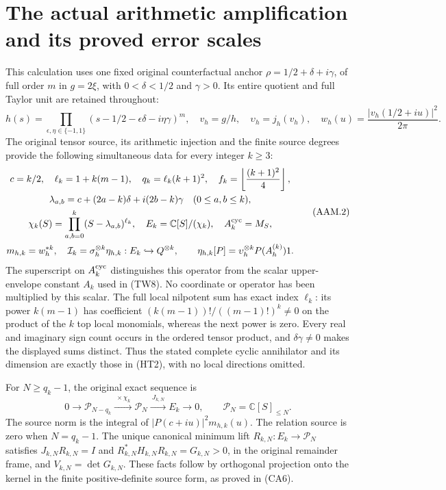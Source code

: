 \section{The actual arithmetic amplification and its proved error scales}
\label{CFStage:sec:arithmetic-amplification-match}

This calculation uses one fixed original counterfactual anchor
$\rho=1/2+\delta+i\gamma$, of full order $m$ in $g=2\xi$, with
$0<\delta<1/2$ and $\gamma>0$. Its entire quotient and full Taylor
unit are retained throughout:
\[
 h(s)=\prod_{\epsilon,\eta\in\{-1,1\}}
 (s-1/2-\epsilon\delta-i\eta\gamma)^m,
 \quad v_h=g/h,\quad \upsilon_h=j_h(v_h),\quad
 w_h(u)=\frac{|v_h(1/2+iu)|^2}{2\pi}.
 \tag{AAM.1}
\]
The original tensor source, its arithmetic injection and the finite
source degrees provide the following simultaneous data for every
integer $k\geq3$:
\[
 \begin{gathered}
 c=k/2,\quad \ell_k=1+k(m-1),\quad q_k=\ell_k(k+1)^2,\quad
 f_k=\left\lfloor\frac{(k+1)^2}{4}\right\rfloor,\\
 \lambda_{a,b}=c+(2a-k)\delta+i(2b-k)\gamma\quad(0\leq a,b\leq k),\\
 \chi_k(S)=\prod_{a,b=0}^k(S-\lambda_{a,b})^{\ell_k},\quad
 E_k=\mathbb C[S]/(\chi_k),\quad A_k^{\rm cyc}=M_S,\\
 m_{h,k}=w_h^{*k},\quad
 \mathcal I_k=\sigma_h^{\otimes k}\eta_{h,k}:E_k\hookrightarrow Q^{\otimes k},
 \qquad\eta_{h,k}[P]=\upsilon_h^{\otimes k}P(A_h^{(k)})1.
 \end{gathered}
 \tag{AAM.2}
\]
The superscript on $A_k^{\rm cyc}$ distinguishes this operator from
the scalar upper-envelope constant $A_k$ used in (TW8). No coordinate
or operator has been multiplied by this scalar.
The full local nilpotent sum has exact index $\ell_k$: its power
$k(m-1)$ has coefficient $(k(m-1))!/((m-1)!)^k\ne0$ on the product
of the $k$ top local monomials, whereas the next power is zero.
Every real and imaginary sign count occurs in the ordered tensor
product, and $\delta\gamma\ne0$ makes the displayed sums distinct.
Thus the stated complete cyclic annihilator and its dimension are
exactly those in (HT2), with no local directions omitted.

For $N\geq q_k-1$, the original exact sequence is
\[
 0\longrightarrow\mathcal P_{N-q_k}
 \xrightarrow{\ \times\chi_k\ }\mathcal P_N
 \xrightarrow{\ J_{k,N}\ }E_k\longrightarrow0,
 \qquad \mathcal P_N=\mathbb C[S]_{\leq N}.
 \tag{AAM.3}
\]
The source norm is the integral of $|P(c+iu)|^2m_{h,k}(u)$.
The relation source is zero when $N=q_k-1$. The unique canonical
minimum lift $R_{k,N}:E_k\to\mathcal P_N$ satisfies
$J_{k,N}R_{k,N}=I$ and $R_{k,N}^*H_{k,N}R_{k,N}=G_{k,N}>0$,
in the original remainder frame, and $V_{k,N}=\det G_{k,N}$.
These facts follow by orthogonal projection onto the kernel in the
finite positive-definite source form, as proved in (CA6).

